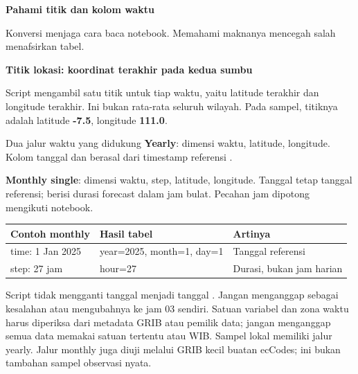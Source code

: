 \documentclass[11pt,a4paper]{article}
\newcommand{\pagetitle}[3]{\clearpage{\color{teal}\small\bfseries LANGKAH #1}\par{\color{slate}\LARGE\bfseries #2}\par\vspace{2mm}#3\par\vspace{3mm}}
\begin{document}
\pagetitle{7}{Pahami titik dan kolom waktu}{Konversi menjaga cara baca notebook. Memahami maknanya mencegah salah menafsirkan tabel.}
\label{pg:semantics}
\textbf{Titik lokasi: koordinat terakhir pada kedua sumbu}\par
Script mengambil satu titik untuk tiap waktu, yaitu latitude terakhir dan
longitude terakhir. Ini bukan rata-rata seluruh wilayah. Pada sampel, titiknya
adalah latitude \textbf{-7.5}, longitude \textbf{111.0}.
\begin{center}
\par\noindent{}\par
\end{center}
\begin{panel}{Dua jalur waktu yang didukung}
\textbf{Yearly}: dimensi waktu, latitude, longitude. Kolom tanggal dan
 berasal dari timestamp referensi .

\textbf{Monthly single}: dimensi waktu, step, latitude, longitude. Tanggal
tetap tanggal referensi;  berisi durasi forecast  dalam
jam bulat. Pecahan jam dipotong mengikuti notebook.
\end{panel}
\begin{center}
\begin{tabular}{@{}lll@{}}
\toprule
\textbf{Contoh monthly}&\textbf{Hasil tabel}&\textbf{Artinya}\\
\midrule
time: 1 Jan 2025&year=2025, month=1, day=1&Tanggal referensi\\
step: 27 jam&hour=27&Durasi, bukan jam harian\\
\bottomrule
\end{tabular}\par
\end{center}
Script tidak mengganti tanggal menjadi tanggal . Jangan
menganggap  sebagai kesalahan atau mengubahnya ke jam 03 sendiri.
Satuan variabel dan zona waktu harus diperiksa dari metadata GRIB atau pemilik
data; jangan menganggap semua data memakai satuan tertentu atau WIB.
Sampel lokal memiliki jalur yearly. Jalur monthly juga diuji melalui GRIB kecil
buatan ecCodes; ini bukan tambahan sampel observasi nyata.
\end{document}

